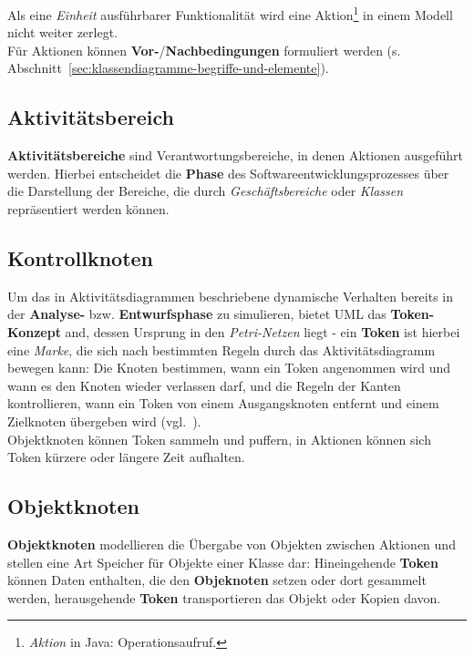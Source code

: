 \noindent
Als eine \textit{Einheit} ausführbarer Funktionalität wird eine Aktion\footnote{
\textit{Aktion} in Java: Operationsaufruf.
} in einem Modell nicht weiter zerlegt.\\
Für Aktionen können \textbf{Vor-}/\textbf{Nachbedingungen} formuliert werden (s. Abschnitt~\ref{sec:klassendiagramme-begriffe-und-elemente}).

\subsection{Aktivitätsbereich}
\textbf{Aktivitätsbereiche} sind Verantwortungsbereiche, in denen Aktionen ausgeführt werden.
Hierbei entscheidet die \textbf{Phase} des Softwareentwicklungsprozesses über die Darstellung der Bereiche, die durch \textit{Geschäftsbereiche} oder \textit{Klassen} repräsentiert werden können.

\subsection{Kontrollknoten}
Um das in Aktivitätsdiagrammen beschriebene dynamische Verhalten bereits in der \textbf{Analyse-} bzw. \textbf{Entwurfsphase} zu simulieren, bietet UML das \textbf{Token-Konzept} and, dessen Ursprung in den \textit{Petri-Netzen} liegt - ein \textbf{Token} ist hierbei eine \textit{Marke}, die sich nach bestimmten Regeln durch das Aktivitätsdiagramm bewegen kann: Die Knoten bestimmen, wann ein Token angenommen wird und wann es den Knoten wieder verlassen darf, und die Regeln der Kanten kontrollieren, wann ein Token von einem Ausgangsknoten entfernt und einem Zielknoten übergeben wird (vgl.~\cite[323]{Bal05}).\\
Objektknoten können Token sammeln und puffern, in Aktionen können sich Token kürzere oder längere Zeit aufhalten.\\

\subsection{Objektknoten}


\textbf{Objektknoten} modellieren die Übergabe von Objekten zwischen Aktionen und stellen eine Art Speicher für Objekte einer Klasse dar: Hineingehende \textbf{Token} können Daten enthalten, die den \textbf{Objeknoten} setzen oder dort gesammelt werden, herausgehende \textbf{Token} transportieren das Objekt oder Kopien davon.\\

